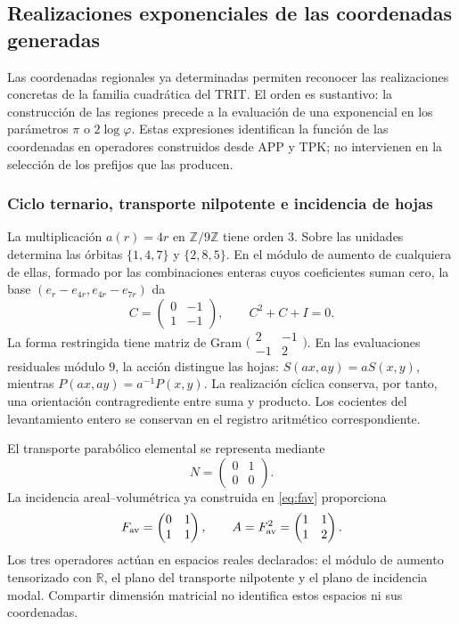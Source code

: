 \documentclass[a4paper,10pt]{article}
\theoremstyle{definition}\newtheorem{definition}[theorem]{Definición}
\theoremstyle{remark}\newtheorem{remark}[theorem]{Observación}
\numberwithin{equation}{section}
\begin{document}
\subsection{Realizaciones exponenciales de las coordenadas generadas}
\label{euler-trit-articulacion}

Las coordenadas regionales ya determinadas permiten reconocer las
realizaciones concretas de la familia cuadrática del TRIT. El orden es
sustantivo: la construcción de las regiones precede a la evaluación de una
exponencial en los parámetros \(\pi\) o \(2\log\varphi\). Estas expresiones
identifican la función de las coordenadas en operadores construidos desde
APP y TPK; no intervienen en la selección de los prefijos que las producen.

\subsubsection{Ciclo ternario, transporte nilpotente e incidencia de hojas}

La multiplicación \(a(r)=4r\) en \(\mathbb Z/9\mathbb Z\) tiene orden
\(3\). Sobre las unidades determina las órbitas \(\{1,4,7\}\) y
\(\{2,8,5\}\). En el módulo de aumento de cualquiera de ellas, formado por
las combinaciones enteras cuyos coeficientes suman cero, la base
\((e_r-e_{4r},e_{4r}-e_{7r})\) da
\[
 C=\begin{pmatrix}0&-1\\1&-1\end{pmatrix},
 \qquad C^2+C+I=0.
\]
La forma restringida tiene matriz de Gram
\(\bigl(\begin{smallmatrix}2&-1\\-1&2\end{smallmatrix}\bigr)\).
En las evaluaciones residuales módulo \(9\), la acción distingue las hojas:
\(S(ax,ay)=aS(x,y)\), mientras \(P(ax,ay)=a^{-1}P(x,y)\).
La realización cíclica conserva, por tanto, una orientación contragrediente
entre suma y producto. Los cocientes del levantamiento entero se conservan
en el registro aritmético correspondiente.

El transporte parabólico elemental se representa mediante
\[
 N=\begin{pmatrix}0&1\\0&0\end{pmatrix}.
\]
La incidencia areal--volumétrica ya construida en \eqref{eq:fav} proporciona
\[
 F_{\rm av}=\begin{pmatrix}0&1\\1&1\end{pmatrix},
 \qquad A=F_{\rm av}^2=\begin{pmatrix}1&1\\1&2\end{pmatrix}.
\]
Los tres operadores actúan en espacios reales declarados: el módulo de
aumento tensorizado con \(\mathbb R\), el plano del transporte nilpotente y
el plano de incidencia modal. Compartir dimensión matricial no identifica
estos espacios ni sus coordenadas.
\end{document}
